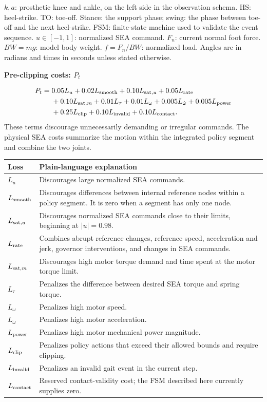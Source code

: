 \documentclass[10pt,a4paper]{article}
\newcommand{\titleline}[1]{{\Large\bfseries\color{blue}#1}\par\vspace{3mm}}
\newcommand{\sub}[1]{\par\medskip{\bfseries #1}\par}
\begin{document}
\sub{Conventions}
$k,a$: prosthetic knee and ankle, on the left side in the observation schema. HS: heel-strike. TO: toe-off. Stance: the support phase; swing: the phase between toe-off and the next heel-strike. FSM: finite-state machine used to validate the event sequence. $u\in[-1,1]$: normalized SEA command. $F_n$: current normal foot force. $BW=mg$: model body weight. $f=F_n/BW$: normalized load. Angles are in radians and times in seconds unless stated otherwise.

\clearpage
\titleline{Pre-clipping costs: $P_t$}
\begin{align*}
P_t={}&0.05L_u+0.02L_{\rm smooth}+0.10L_{{\rm sat},u}+0.05L_{\rm rate}\\
&+0.10L_{{\rm sat},m}+0.01L_\tau+0.01L_\omega
+0.005L_{\dot\omega}+0.005L_{\rm power}\\
&+0.25L_{\rm clip}+0.10L_{\rm invalid}+0.10L_{\rm contact}.
\end{align*}
These terms discourage unnecessarily demanding or irregular commands. The physical SEA costs summarize the motion within the integrated policy segment and combine the two joints.

\begin{tabularx}{\textwidth}{@{}lX@{}}\toprule
Loss & Plain-language explanation \\\midrule
$L_u$ & Discourages large normalized SEA commands.\\
$L_{\rm smooth}$ & Discourages differences between internal reference nodes within a policy segment. It is zero when a segment has only one node.\\
$L_{{\rm sat},u}$ & Discourages normalized SEA commands close to their limits, beginning at $|u|=0.98$.\\
$L_{\rm rate}$ & Combines abrupt reference changes, reference speed, acceleration and jerk, governor interventions, and changes in SEA commands.\\
$L_{{\rm sat},m}$ & Discourages high motor torque demand and time spent at the motor torque limit.\\
$L_\tau$ & Penalizes the difference between desired SEA torque and spring torque.\\
$L_\omega$ & Penalizes high motor speed.\\
$L_{\dot\omega}$ & Penalizes high motor acceleration.\\
$L_{\rm power}$ & Penalizes high motor mechanical power magnitude.\\
$L_{\rm clip}$ & Penalizes policy actions that exceed their allowed bounds and require clipping.\\
$L_{\rm invalid}$ & Penalizes an invalid gait event in the current step.\\
$L_{\rm contact}$ & Reserved contact-validity cost; the FSM described here currently supplies zero.\\\bottomrule
\end{tabularx}
\end{document}
